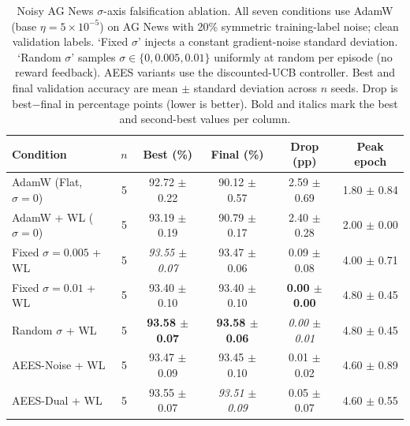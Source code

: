 \begin{table}[t]
\centering
\caption{Noisy AG News $\sigma$-axis falsification ablation. All seven conditions use AdamW (base $\eta = 5\times10^{-5}$) on AG News with 20\% symmetric training-label noise; clean validation labels. `Fixed $\sigma$' injects a constant gradient-noise standard deviation. `Random $\sigma$' samples $\sigma \in \{0, 0.005, 0.01\}$ uniformly at random per episode (no reward feedback). AEES variants use the discounted-UCB controller. Best and final validation accuracy are mean $\pm$ standard deviation across $n$ seeds. Drop is best$-$final in percentage points (lower is better). Bold and italics mark the best and second-best values per column.}
\label{tab:nlp_noise_ablation}
\small
\setlength{\tabcolsep}{5pt}
\begin{tabular}{lccccc}
\toprule
Condition & $n$ & Best (\%) & Final (\%) & Drop (pp) & Peak epoch \\
\midrule
AdamW (Flat, $\sigma=0$) & 5 & 92.72 $\pm$ 0.22 & 90.12 $\pm$ 0.57 & 2.59 $\pm$ 0.69 & 1.80 $\pm$ 0.84 \\
AdamW + WL ($\sigma=0$) & 5 & 93.19 $\pm$ 0.19 & 90.79 $\pm$ 0.17 & 2.40 $\pm$ 0.28 & 2.00 $\pm$ 0.00 \\
\midrule
Fixed $\sigma=0.005$ + WL & 5 & \emph{93.55 $\pm$ 0.07} & 93.47 $\pm$ 0.06 & 0.09 $\pm$ 0.08 & 4.00 $\pm$ 0.71 \\
Fixed $\sigma=0.01$ + WL & 5 & 93.40 $\pm$ 0.10 & 93.40 $\pm$ 0.10 & \textbf{0.00 $\pm$ 0.00} & 4.80 $\pm$ 0.45 \\
Random $\sigma$ + WL & 5 & \textbf{93.58 $\pm$ 0.07} & \textbf{93.58 $\pm$ 0.06} & \emph{0.00 $\pm$ 0.01} & 4.80 $\pm$ 0.45 \\
AEES-Noise + WL & 5 & 93.47 $\pm$ 0.09 & 93.45 $\pm$ 0.10 & 0.01 $\pm$ 0.02 & 4.60 $\pm$ 0.89 \\
AEES-Dual + WL & 5 & 93.55 $\pm$ 0.07 & \emph{93.51 $\pm$ 0.09} & 0.05 $\pm$ 0.07 & 4.60 $\pm$ 0.55 \\
\bottomrule
\end{tabular}
\end{table}
